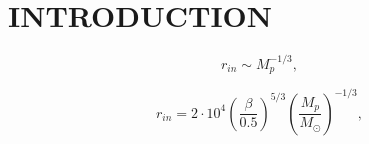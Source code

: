 \chapter{INTRODUCTION}
\thispagestyle{empty}


\lipsum[1]
\begin{equation}
    r_{in} \sim M_p^{-1/3},
\end{equation}

\lipsum[2]

\begin{equation}
	r_{in} = 2 \cdot 10^{4} \left(\frac{\beta}{0.5}\right)^{5/3} \left(\frac{M_p}{M_{\odot}}\right)^{-1/3},
\end{equation}

\lipsum[3]
